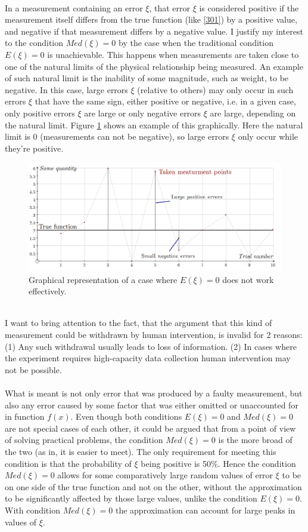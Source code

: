 \documentclass[11pt,a4paper]{article}
\numberwithin{equation}{subsection}
\begin{document}
\\
In a measurement containing an error $\xi$, that error $\xi$ is considered positive if the measurement itself differs from the true function (like \vref{301}) by a positive value, and negative if that measurement differs by a negative value. I justify my interest to the condition $Med(\xi)=0$ by the case when the traditional condition $E(\xi)=0$ is unachievable. This happens when measurements are taken close to one of the natural limits of the physical relationship being measured. An example of such natural limit is the inability of some magnitude, such as weight, to be negative. In this case, large errors $\xi$ (relative to others) may only occur in such errors $\xi$ that have the same sign, either positive or negative, i.e. in a given case, only positive errors $\xi$ are large or only negative errors $\xi$ are large, depending on the natural limit. Figure \ref{fig:graph-nl} shows an example of this graphically. Here the natural limit is 0 (measurements can not be negative), so large errors $\xi$ only occur while they're positive.
\begin{figure}[h!]
\includegraphics[scale=0.35]{updated/fig1}
\centering
\caption{Graphical representation of a case where $E(\xi)=0$ does not work effectively.}
\label{fig:graph-nl}
\end{figure}
\\
I want to bring attention to the fact, that the argument that this kind of measurement could be withdrawn by human intervention, is invalid for 2 reasons: (1) Any such withdrawal usually leads to loss of information. (2) In cases where the experiment requires high-capacity data collection human intervention may not be possible.\\
\\
What is meant is not only error that was produced by a faulty measurement, but also any error caused by some factor that was either omitted or unaccounted for in function $f(x)$. Even though both conditions $E(\xi)=0$ and $Med(\xi)=0$ are not special cases of each other, it could be argued that from a point of view of solving practical problems, the condition $Med(\xi)=0$ is the more broad of the two (as in, it is easier to meet). The only requirement for meeting this condition is that the probability of $\xi$ being positive is 50\%.  Hence the condition $Med(\xi)=0$ allows for some comparatively large random values of error $\xi$ to be on one side of the true function and not on the other, without the approximation to be significantly affected by those large values, unlike the condition $E(\xi)=0$. With condition $Med(\xi)=0$ the approximation can account for large peaks in values of $\xi$.\\
\end{document}
